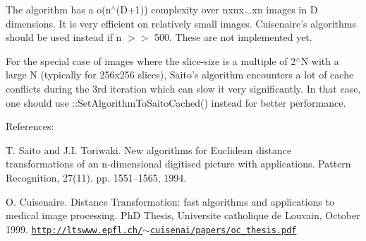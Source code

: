 The algorithm has a o(n$^\wedge$(D+1)) complexity over nxnx...xn images in D dimensions. It is very efficient on relatively small images. Cuisenaire's algorithms should be used instead if n $>$$>$ 500. These are not implemented yet.

For the special case of images where the slice-\/size is a multiple of 2$^\wedge$\-N with a large N (typically for 256x256 slices), Saito's algorithm encounters a lot of cache conflicts during the 3rd iteration which can slow it very significantly. In that case, one should use \-::\-Set\-Algorithm\-To\-Saito\-Cached() instead for better performance.

References\-:

T. Saito and J.\-I. Toriwaki. New algorithms for Euclidean distance transformations of an n-\/dimensional digitised picture with applications. Pattern Recognition, 27(11). pp. 1551--1565, 1994.

O. Cuisenaire. Distance Transformation\-: fast algorithms and applications to medical image processing. Ph\-D Thesis, Universite catholique de Louvain, October 1999. \href{http://ltswww.epfl.ch/~cuisenai/papers/oc_thesis.pdf}{\tt http\-://ltswww.\-epfl.\-ch/$\sim$cuisenai/papers/oc\-\_\-thesis.\-pdf}

